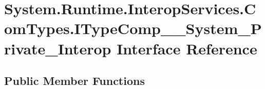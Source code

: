 \hypertarget{interface_system_1_1_runtime_1_1_interop_services_1_1_com_types_1_1_i_type_comp_____system___private___interop}{}\section{System.\+Runtime.\+Interop\+Services.\+Com\+Types.\+I\+Type\+Comp\+\_\+\+\_\+\+System\+\_\+\+Private\+\_\+\+Interop Interface Reference}
\label{interface_system_1_1_runtime_1_1_interop_services_1_1_com_types_1_1_i_type_comp_____system___private___interop}
\subsection*{Public Member Functions}
